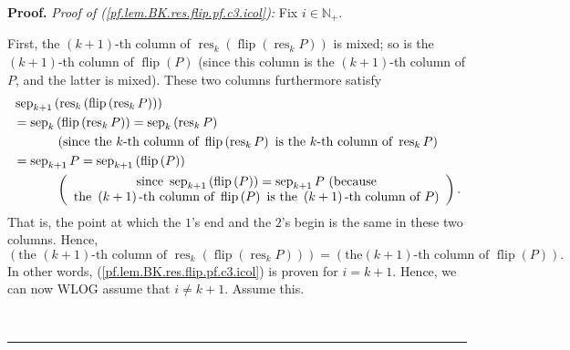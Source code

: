 \documentclass[numbers=enddot,12pt,final,onecolumn,notitlepage]{scrartcl}%
\theoremstyle{definition}
\newenvironment{proof}[1][Proof]{\noindent\textbf{#1.} }{\ \rule{0.5em}{0.5em}}
\newenvironment{verlong}{}{}
\begin{document}
\begin{verlong}
\begin{proof}
\textit{Proof of (\ref{pf.lem.BK.res.flip.pf.c3.icol}):} Fix $i\in
\mathbb{N}_{+}$.

First, the $\left(  k+1\right)  $-th column of $\operatorname*{res}%
\nolimits_{k}\left(  \operatorname*{flip}\left(  \operatorname*{res}%
\nolimits_{k}P\right)  \right)  $ is mixed; so is the $\left(  k+1\right)
$-th column of $\operatorname*{flip}\left(  P\right)  $ (since this column is
the $\left(  k+1\right)  $-th column of $P$, and the latter is mixed). These
two columns furthermore satisfy%
\begin{align*}
&  \operatorname*{sep}\nolimits_{k+1}\left(  \operatorname*{res}%
\nolimits_{k}\left(  \operatorname*{flip}\left(  \operatorname*{res}%
\nolimits_{k}P\right)  \right)  \right) \\
&  =\operatorname*{sep}\nolimits_{k}\left(  \operatorname*{flip}\left(
\operatorname*{res}\nolimits_{k}P\right)  \right)  =\operatorname*{sep}%
\nolimits_{k}\left(  \operatorname*{res}\nolimits_{k}P\right) \\
&  \ \ \ \ \ \ \ \ \ \ \left(  \text{since the }k\text{-th column of
}\operatorname*{flip}\left(  \operatorname*{res}\nolimits_{k}P\right)  \text{
is the }k\text{-th column of }\operatorname*{res}\nolimits_{k}P\right) \\
&  =\operatorname*{sep}\nolimits_{k+1}P=\operatorname*{sep}\nolimits_{k+1}%
\left(  \operatorname*{flip}\left(  P\right)  \right) \\
&  \ \ \ \ \ \ \ \ \ \ \left(
\begin{array}
[c]{c}%
\text{since }\operatorname*{sep}\nolimits_{k+1}\left(  \operatorname*{flip}%
\left(  P\right)  \right)  =\operatorname*{sep}\nolimits_{k+1}P\text{
(because}\\
\text{the }\left(  k+1\right)  \text{-th column of }\operatorname*{flip}%
\left(  P\right)  \text{ is the }\left(  k+1\right)  \text{-th column of
}P\text{)}%
\end{array}
\right)  .
\end{align*}
That is, the point at which the $1$'s end and the $2$'s begin is the same in
these two columns. Hence,%
\[
\left(  \text{the }\left(  k+1\right)  \text{-th column of }%
\operatorname*{res}\nolimits_{k}\left(  \operatorname*{flip}\left(
\operatorname*{res}\nolimits_{k}P\right)  \right)  \right)  =\left(  \text{the
}\left(  k+1\right)  \text{-th column of }\operatorname*{flip}\left(
P\right)  \right)  .
\]
In other words, (\ref{pf.lem.BK.res.flip.pf.c3.icol}) is proven for $i=k+1$.
Hence, we can now WLOG assume that $i\neq k+1$. Assume this.


\end{proof}
\end{verlong}
\end{document}
